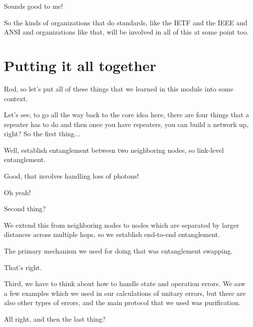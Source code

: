 \rrr Sounds good to me!

So the kinds of organizations that do standards, like the IETF and the IEEE and ANSI and organizations like that, will be involved in all of this at some point too.

\section{Putting it all together}


\mmm Rod, so let's put all of these things that we learned in this module into some context.



\rrr Let's see, to go all the way back to the core idea here, there are four things that a repeater has to do and then once you have repeaters, you can build a network up, right? So the first thing...

\mmm Well, establish entanglement between two neighboring nodes, so link-level entanglement.

\rrr Good, that involves handling loss of photons!

\mmm Oh yeah!

\rrr Second thing?

\mmm We extend this from neighboring nodes to nodes which are separated by larger distances across multiple hops, so we establish end-to-end entanglement.

\rrr The primary mechanism we used for doing that was entanglement swapping. 

\mmm That's right.

Third, we have to think about how to handle state and operation errors. We saw a few examples which we used in our calculations of unitary errors, but there are also other types of errors, and the main protocol that we used was purification.

\rrr All right, and then the last thing?

